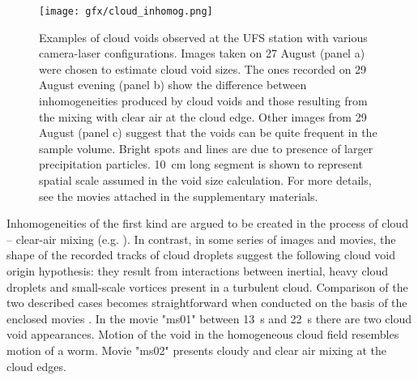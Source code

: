 \documentclass[../main.tex]{subfiles}
\begin{document}
\begin{figure}[h]
\centering
\noindent\texttt{[image: gfx/cloud\_inhomog.png]}
\caption{Examples of cloud voids observed at the UFS station with various camera-laser configurations. Images taken on 27 August (panel a) were chosen to estimate cloud void sizes. The ones recorded on 29 August evening (panel b) show the difference between inhomogeneities produced by cloud voids and those resulting from the mixing with clear air at the cloud edge. Other images from 29 August (panel c) suggest that the voids can be quite frequent in the sample volume. Bright spots and lines are due to presence of larger precipitation particles. 10~cm long segment is shown to represent spatial scale assumed in the void size calculation. For more details, see the movies attached in the supplementary materials.}
\label{fig:ch4_3}
\end{figure}

Inhomogeneities of the first kind are argued to be created in the process of cloud -- clear-air mixing (e.g. \cite{Warhaft_2000}). In contrast, in some series of images and movies, the shape of the recorded tracks of cloud droplets suggest the following cloud void origin hypothesis: they result from interactions between inertial, heavy cloud droplets and small-scale vortices present in a turbulent cloud. Comparison of the two described cases becomes straightforward when conducted on the basis of the enclosed movies \citep{database}. In the movie "ms01" between 13~s and 22~s there are two cloud void appearances. Motion of the void in the homogeneous cloud field resembles motion of a worm. Movie "ms02" presents cloudy and clear air mixing at the cloud edges. \\
\end{document}
